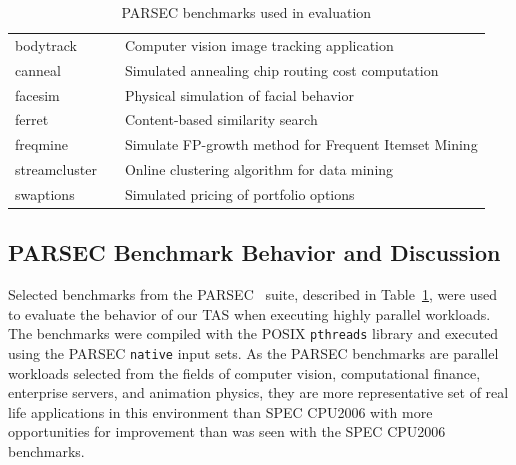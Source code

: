 \documentclass[times, 10pt,twocolumn]{IEEEtran}
\begin{document}
\begin{small}
\begin{table}[phbt] 
\centering
 \caption{PARSEC benchmarks used in evaluation}
\label{tab:parsecbench}
\begin{tabular}[bthp]{l l p{5cm}} 
\hline 
\hline 
bodytrack &  & Computer vision image tracking application \\
canneal &  & Simulated annealing chip routing cost computation \\
facesim &  & Physical simulation of facial behavior \\
ferret &  & Content-based similarity search \\
freqmine &  & Simulate FP-growth method for Frequent Itemset Mining \\
streamcluster &  & Online clustering algorithm for data mining \\
swaptions &  & Simulated pricing of portfolio options \\
\hline
\end{tabular}
\end{table}
\end{small}
\subsection{PARSEC Benchmark Behavior and Discussion}
\label{sec:mult-behav} 
Selected benchmarks from the PARSEC~\cite{Bienia2008} suite, described
in Table~\ref{tab:parsecbench}, were used to evaluate the behavior of
our TAS when executing highly parallel workloads. The benchmarks were
compiled with the POSIX \texttt{pthreads} library and executed using the
PARSEC \texttt{native} input sets.  As the PARSEC benchmarks are
parallel workloads selected from the fields of computer vision,
computational finance, enterprise servers, and animation physics, they
are more representative set of real life applications in this
environment than SPEC CPU2006 with more opportunities for improvement
than was seen with the SPEC CPU2006 benchmarks.
\end{document}

